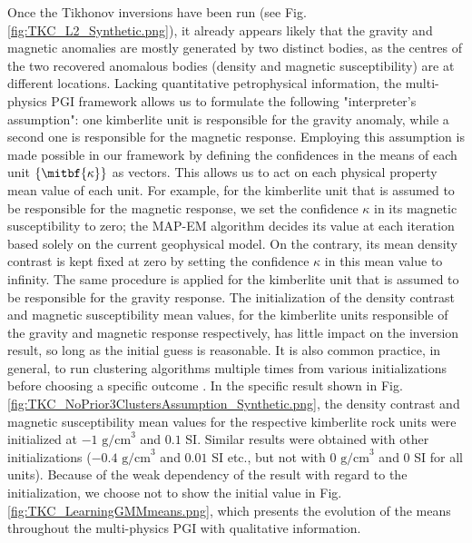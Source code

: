 \documentclass[extra, mreferee]{gji_joint} %
\begin{document}
Once the Tikhonov inversions have been run (see Fig. \ref{fig:TKC_L2_Synthetic.png}), it already appears likely that the gravity and magnetic anomalies are mostly generated by two distinct bodies, as the centres of the two recovered anomalous bodies (density and magnetic susceptibility) are at different locations. Lacking quantitative petrophysical information, the multi-physics PGI framework allows us to formulate the following "interpreter's assumption": one kimberlite unit is responsible for the gravity anomaly, while a second one is responsible for the magnetic response. Employing this assumption is made possible in our framework by defining the confidences in the means of each unit $\{\mitbf{\kappa}\}$ as vectors. This allows us to act on each physical property mean value of each unit. For example, for the kimberlite unit that is assumed to be responsible for the magnetic response, we set the confidence $\kappa$ in its magnetic susceptibility to zero; the MAP-EM algorithm decides its value at each iteration based solely on the current geophysical model. On the contrary, its mean density contrast is kept fixed at zero by setting the confidence $\kappa$ in this mean value to infinity. The same procedure is applied for the kimberlite unit that is assumed to be responsible for the gravity response. The initialization of the density contrast and magnetic susceptibility mean values, for the kimberlite units responsible of the gravity and magnetic response respectively, has little impact on the inversion result, so long as the initial guess is reasonable. It is also common practice, in general, to run clustering algorithms multiple times from various initializations before choosing a specific outcome \citep{ExpectationMaximization, Murphy2012}. In the specific result shown in Fig. \ref{fig:TKC_NoPrior3ClustersAssumption_Synthetic.png}, the density contrast and magnetic susceptibility mean values for the respective kimberlite rock units were initialized at $-1 \text{ g/cm}^3$ and $0.1$ SI. Similar results were obtained with other initializations ($-0.4 \text{ g/cm}^3$ and $0.01$ SI etc., but not with $0 \text{ g/cm}^3$ and $0$ SI for all units). Because of the weak dependency of the result with regard to the initialization, we choose not to show the initial value in Fig. \ref{fig:TKC_LearningGMMmeans.png}, which presents the evolution of the means throughout the multi-physics PGI with qualitative information.

\end{document}
